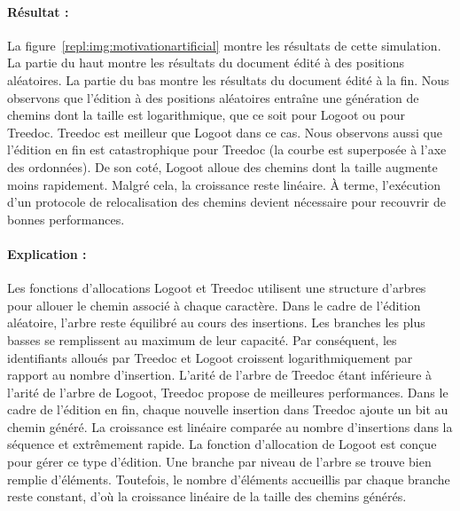 \paragraph{Résultat :} La figure~\ref{repl:img:motivationartificial} montre les
résultats de cette simulation. La partie du haut montre les résultats du
document édité à des positions aléatoires. La partie du bas montre les résultats
du document édité à la fin. Nous observons que l'édition à des positions
aléatoires entraîne une génération de chemins dont la taille est logarithmique,
que ce soit pour Logoot ou pour Treedoc. Treedoc est meilleur que Logoot dans ce
cas. Nous observons aussi que l'édition en fin est catastrophique pour Treedoc
(la courbe est superposée à l'axe des ordonnées). De son coté, Logoot alloue des
chemins dont la taille augmente moins rapidement. Malgré cela, la croissance
reste linéaire. À terme, l'exécution d'un protocole de relocalisation des
chemins devient nécessaire pour recouvrir de bonnes performances.

\paragraph{Explication :} Les fonctions d'allocations Logoot et Treedoc
utilisent une structure d'arbres pour allouer le chemin associé à chaque
caractère. Dans le cadre de l'édition aléatoire, l'arbre reste équilibré au
cours des insertions. Les branches les plus basses se remplissent au maximum de
leur capacité. Par conséquent, les identifiants alloués par Treedoc et Logoot
croissent logarithmiquement par rapport au nombre d'insertion. L'arité de
l'arbre de Treedoc étant inférieure à l'arité de l'arbre de Logoot, Treedoc
propose de meilleures performances. Dans le cadre de l'édition en fin, chaque
nouvelle insertion dans Treedoc ajoute un bit au chemin généré. La croissance
est linéaire comparée au nombre d'insertions dans la séquence et extrêmement
rapide. La fonction d'allocation de Logoot est conçue pour gérer ce type
d'édition. Une branche par niveau de l'arbre se trouve bien remplie
d'éléments. Toutefois, le nombre d'éléments accueillis par chaque branche reste
constant, d'où la croissance linéaire de la taille des chemins générés.




